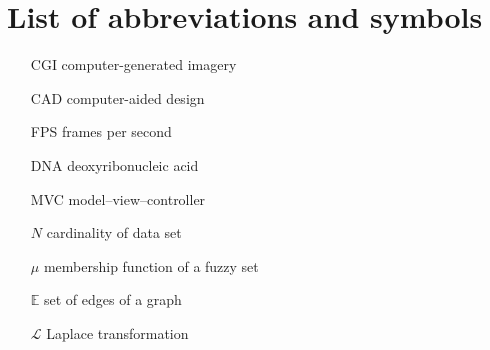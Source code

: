 \chapter{List of abbreviations and symbols}

\begin{itemize}
\item[CGI] computer-generated imagery
\item[CAD] computer-aided design
\item[FPS] frames per second
\item[DNA] deoxyribonucleic acid
\item[MVC] model--view--controller 
\item[$N$] cardinality of data set
\item[$\mu$] membership function of a fuzzy set
\item[$\mathbb{E}$] set of edges of a graph
\item[$\mathcal{L}$] Laplace transformation
\end{itemize}